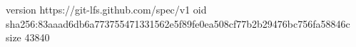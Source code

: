 version https://git-lfs.github.com/spec/v1
oid sha256:83aaad6db6a773755471331562e5f89fe0ea508cf77b2b29476bc756fa58846c
size 43840

